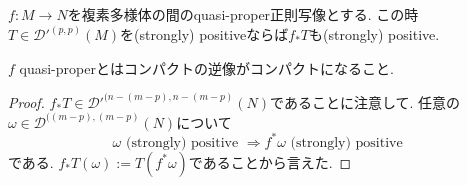 \begin{tcolorbox}[mybox]
\begin{lem}
\label{lem-M-7.4.8}
$f : M \to N$を複素多様体の間のquasi-proper正則写像とする. 
この時$T \in {\mathcal{D}'}^{(p,p)}(M)$を(strongly) positiveならば$f_{*}T$も(strongly) positive.
\end{lem}
\end{tcolorbox}
$f$ quasi-properとはコンパクトの逆像がコンパクトになること. 
\begin{proof}
$f_{*} T\in {\mathcal{D}'}^{(n-(m-p),n-(m-p)}(N)$であることに注意して. 
任意の
$\omega \in {\mathcal{D}}^{((m-p),(m-p)}(N)$について
$$
\omega \text{ (strongly) positive }
\Rightarrow 
f^{*}\omega \text{ (strongly) positive }
$$
である. $f_{*} T(\omega):=T(f^{*}\omega)$であることから言えた. 
\end{proof}





